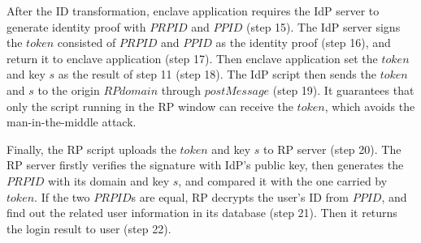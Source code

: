 After the ID transformation, enclave application requires the IdP server to generate identity proof with $PRPID$ and $PPID$ (step 15). The IdP server signs the $token$ consisted of $PRPID$ and $PPID$ as the identity proof (step 16), and return it to enclave application (step 17). Then enclave application set the $token$ and key $s$ as the result of step 11 (step 18). The IdP script then sends the $token$ and $s$ to the origin $RPdomain$ through $postMessage$ (step 19). It guarantees that only the script running in the RP window can receive the $token$, which avoids the man-in-the-middle attack.

Finally, the RP script uploads the $token$ and key $s$ to RP server (step 20). The RP server firstly verifies the signature with IdP's public key, then generates the $PRPID$ with its domain and key $s$, and compared it with the one carried by $token$. If the two $PRPID$s are equal, RP decrypts the user's ID from $PPID$, and find out the related user information in its database (step 21). Then it returns the login result to user (step 22). 